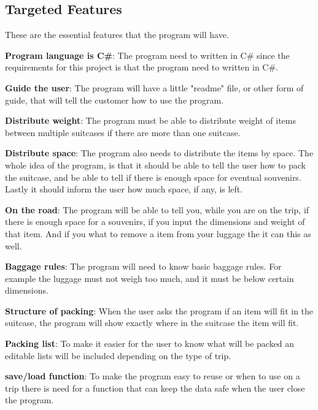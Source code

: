 \subsection{Targeted Features}
These are the essential features that the program will have.\newline

\textbf{Program language is C\#}:
The program need to written in C\# since the requirements for this project is that the program need to written in C\#.

\textbf{Guide the user}:
The program will have a little "readme" file, or other form of guide, that will tell the customer how to use the program.
\newline

\textbf{Distribute weight}:
The program must be able to distribute weight of items between multiple suitcases if there are more than one suitcase.
\newline

\textbf{Distribute space}:
The program also needs to distribute the items by space. The whole idea of the program, is that it should be able to tell the user how to pack the suitcase, and be able to tell if there is enough space for eventual souvenirs. Lastly it should inform the user how much space, if any, is left.
\newline

\textbf{On the road}:
The program will be able to tell you, while you are on the trip, if there is enough space for a souvenirs, if you input the dimensions and weight of that item. And if you what to remove a item from your luggage the it can this as well.
\newline

\textbf{Baggage rules}:
The program will need to know basic baggage rules. For example the luggage must not weigh too much, and it must be below certain dimensions.
\newline

\textbf{Structure of packing}:
When the user asks the program if an item will fit in the suitcase, the program will show exactly where in the suitcase the item will fit.
\newline

\textbf{Packing list}:
To make it easier for the user to know what will be packed an editable lists will be included depending on the type of trip.
\newline

\textbf{save/load function}:
To make the program easy to reuse or when to use on a trip there is need for a function that can keep the data safe when the user close the program.
\newline

